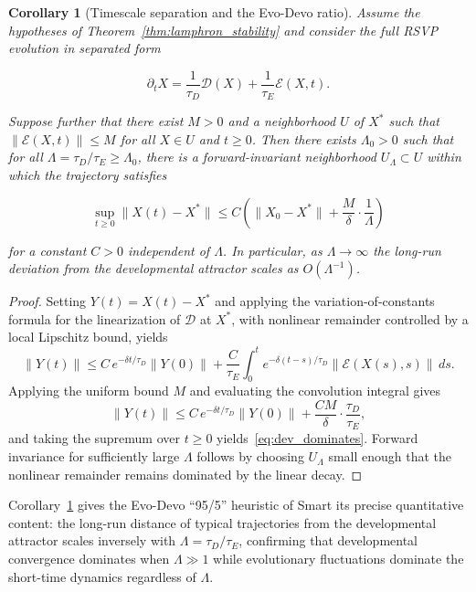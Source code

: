 \documentclass[12pt]{article}
\newtheorem{corollary}{Corollary}[section]
\begin{document}
\begin{corollary}[Timescale separation and the Evo-Devo ratio]
\label{cor:955_timescale}
Assume the hypotheses of Theorem~\ref{thm:lamphron_stability} and consider the full RSVP evolution in separated form

\begin{equation}
\partial_t X = \frac{1}{\tau_D}\mathcal{D}(X) + \frac{1}{\tau_E}\mathcal{E}(X,t).
\label{eq:timescale_split_cor}
\end{equation}

Suppose further that there exist $M > 0$ and a neighborhood $U$ of $X^*$ such that $\|\mathcal{E}(X,t)\| \leq M$ for all $X \in U$ and $t \geq 0$. Then there exists $\Lambda_0 > 0$ such that for all $\Lambda = \tau_D/\tau_E \geq \Lambda_0$, there is a forward-invariant neighborhood $U_\Lambda \subset U$ within which the trajectory satisfies

\begin{equation}
\sup_{t \geq 0}\|X(t) - X^*\| \leq C\!\left(\|X_0 - X^*\| + \frac{M}{\delta}\cdot\frac{1}{\Lambda}\right)
\label{eq:dev_dominates}
\end{equation}

for a constant $C > 0$ independent of $\Lambda$. In particular, as $\Lambda \to \infty$ the long-run deviation from the developmental attractor scales as $O(\Lambda^{-1})$.
\end{corollary}

\begin{proof}
Setting $Y(t) = X(t) - X^*$ and applying the variation-of-constants formula for the linearization of $\mathcal{D}$ at $X^*$, with nonlinear remainder controlled by a local Lipschitz bound, yields
\begin{equation}
\|Y(t)\| \leq C\,e^{-\delta t/\tau_D}\|Y(0)\| + \frac{C}{\tau_E}\int_0^t e^{-\delta(t-s)/\tau_D}\|\mathcal{E}(X(s),s)\|\,ds.
\end{equation}
Applying the uniform bound $M$ and evaluating the convolution integral gives
\begin{equation}
\|Y(t)\| \leq C\,e^{-\delta t/\tau_D}\|Y(0)\| + \frac{CM}{\delta}\cdot\frac{\tau_D}{\tau_E},
\end{equation}
and taking the supremum over $t \geq 0$ yields~\eqref{eq:dev_dominates}. Forward invariance for sufficiently large $\Lambda$ follows by choosing $U_\Lambda$ small enough that the nonlinear remainder remains dominated by the linear decay.
\end{proof}

Corollary~\ref{cor:955_timescale} gives the Evo-Devo ``95/5'' heuristic of Smart \cite{smart2009} its precise quantitative content: the long-run distance of typical trajectories from the developmental attractor scales inversely with $\Lambda = \tau_D/\tau_E$, confirming that developmental convergence dominates when $\Lambda \gg 1$ while evolutionary fluctuations dominate the short-time dynamics regardless of $\Lambda$.
\end{document}
